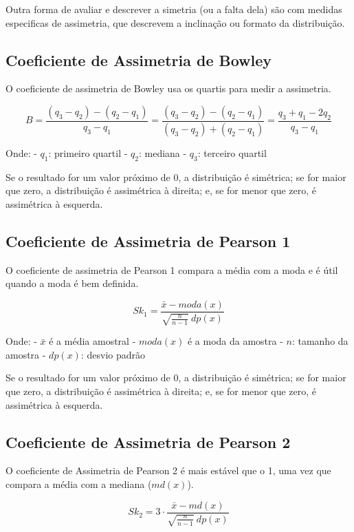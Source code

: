 \documentclass[
]{book}
\begin{document}
Outra forma de avaliar e descrever a simetria (ou a falta dela) são com medidas especificas de assimetria, que descrevem a inclinação ou formato da distribuição.

\subsection{Coeficiente de Assimetria de Bowley}\label{coeficiente-de-assimetria-de-bowley}

O coeficiente de assimetria de Bowley usa os quartis para medir a assimetria.

\[
B = \frac{(q_3-q_2)-(q_2-q_1)}{q_3-q_1} = \frac{(q_3-q_2)-(q_2-q_1)}{(q_3-q_2)+(q_2-q_1)} = \frac{q_3+q_1-2q_2}{q_3-q_1}
\]

Onde:
- \(q_1\): primeiro quartil
- \(q_2\): mediana
- \(q_3\): terceiro quartil

Se o resultado for um valor próximo de 0, a distribuição é simétrica; se for maior que zero, a distribuição é assimétrica à direita; e, se for menor que zero, é assimétrica à esquerda.

\subsection{Coeficiente de Assimetria de Pearson 1}\label{coeficiente-de-assimetria-de-pearson-1}

O coeficiente de assimetria de Pearson 1 compara a média com a moda e é útil quando a moda é bem definida.

\[
Sk_1 = \frac{\bar{x}-moda(x)}{\sqrt{\frac{n}{n-1}}~dp(x)}
\]

Onde:
- \(\bar{x}\) é a média amostral
- \(moda(x)\) é a moda da amostra
- \(n\): tamanho da amostra
- \(dp(x)\): desvio padrão

Se o resultado for um valor próximo de 0, a distribuição é simétrica; se for maior que zero, a distribuição é assimétrica à direita; e, se for menor que zero, é assimétrica à esquerda.

\subsection{Coeficiente de Assimetria de Pearson 2}\label{coeficiente-de-assimetria-de-pearson-2}

O coeficiente de Assimetria de Pearson 2 é mais estável que o 1, uma vez que compara a média com a mediana (\(md(x)\)).

\[
Sk_2 = 3\cdot\frac{\bar{x}-md(x)}{\sqrt{\frac{n}{n-1}}~dp(x)}
\]
\end{document}
